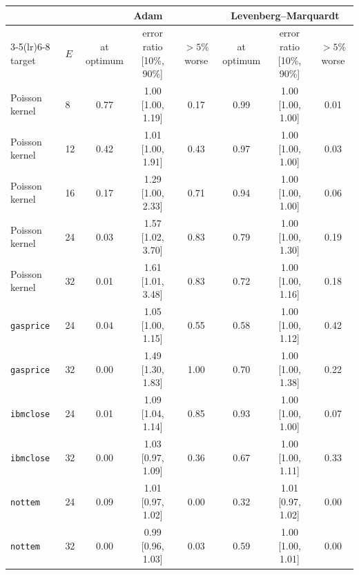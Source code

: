 \begin{tabular}{llcccccc}\toprule
 & & \multicolumn{3}{c}{Adam} & \multicolumn{3}{c}{Levenberg--Marquardt} \\
\cmidrule(lr){3-5}\cmidrule(lr){6-8}
target & $E$ & at optimum & error ratio [10\%, 90\%] & $>5\%$ worse & at optimum & error ratio [10\%, 90\%] & $>5\%$ worse \\\midrule
Poisson kernel & 8 & 0.77 & 1.00 [1.00, 1.19] & 0.17 & 0.99 & 1.00 [1.00, 1.00] & 0.01 \\
Poisson kernel & 12 & 0.42 & 1.01 [1.00, 1.91] & 0.43 & 0.97 & 1.00 [1.00, 1.00] & 0.03 \\
Poisson kernel & 16 & 0.17 & 1.29 [1.00, 2.33] & 0.71 & 0.94 & 1.00 [1.00, 1.00] & 0.06 \\
Poisson kernel & 24 & 0.03 & 1.57 [1.02, 3.70] & 0.83 & 0.79 & 1.00 [1.00, 1.30] & 0.19 \\
Poisson kernel & 32 & 0.01 & 1.61 [1.01, 3.48] & 0.83 & 0.72 & 1.00 [1.00, 1.16] & 0.18 \\
\midrule
\texttt{gasprice} & 24 & 0.04 & 1.05 [1.00, 1.15] & 0.55 & 0.58 & 1.00 [1.00, 1.12] & 0.42 \\
\texttt{gasprice} & 32 & 0.00 & 1.49 [1.30, 1.83] & 1.00 & 0.70 & 1.00 [1.00, 1.38] & 0.22 \\
\midrule
\texttt{ibmclose} & 24 & 0.01 & 1.09 [1.04, 1.14] & 0.85 & 0.93 & 1.00 [1.00, 1.00] & 0.07 \\
\texttt{ibmclose} & 32 & 0.00 & 1.03 [0.97, 1.09] & 0.36 & 0.67 & 1.00 [1.00, 1.11] & 0.33 \\
\midrule
\texttt{nottem} & 24 & 0.09 & 1.01 [0.97, 1.02] & 0.00 & 0.32 & 1.01 [0.97, 1.02] & 0.00 \\
\texttt{nottem} & 32 & 0.00 & 0.99 [0.96, 1.03] & 0.03 & 0.59 & 1.00 [1.00, 1.01] & 0.00 \\
\bottomrule
\end{tabular}
